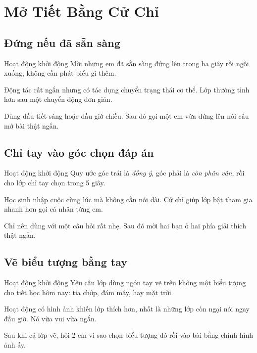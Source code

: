 \chapter{Mở Tiết Bằng Cử Chỉ}

\section{Đứng nếu đã sẵn sàng}
\begin{khoidongbox}{Hoạt động khởi động}
Mời những em đã sẵn sàng đứng lên trong ba giây rồi ngồi xuống, không cần phát biểu gì thêm.
\end{khoidongbox}
\begin{visaohieuqua}
Động tác rất ngắn nhưng có tác dụng chuyển trạng thái cơ thể. Lớp thường tỉnh hơn sau một chuyển động đơn giản.
\end{visaohieuqua}
\begin{cachlam5phut}
Dùng đầu tiết sáng hoặc đầu giờ chiều. Sau đó gọi một em vừa đứng lên nói câu mở bài thật ngắn.
\end{cachlam5phut}
\ngancach

\section{Chỉ tay vào góc chọn đáp án}
\begin{khoidongbox}{Hoạt động khởi động}
Quy ước góc trái là \textit{đồng ý}, góc phải là \textit{còn phân vân}, rồi cho lớp chỉ tay chọn trong 5 giây.
\end{khoidongbox}
\begin{visaohieuqua}
Học sinh nhập cuộc cùng lúc mà không cần nói dài. Cử chỉ giúp lớp bật tham gia nhanh hơn gọi cá nhân từng em.
\end{visaohieuqua}
\begin{cachlam5phut}
Chỉ nên dùng với một câu hỏi rất nhẹ. Sau đó mời hai bạn ở hai phía giải thích thật ngắn.
\end{cachlam5phut}
\ngancach

\section{Vẽ biểu tượng bằng tay}
\begin{khoidongbox}{Hoạt động khởi động}
Yêu cầu lớp dùng ngón tay vẽ trên không một biểu tượng cho tiết học hôm nay: tia chớp, đám mây, hay mặt trời.
\end{khoidongbox}
\begin{visaohieuqua}
Hoạt động có hình ảnh khiến lớp thích hơn, nhất là những lớp còn ngại nói ngay đầu giờ. Nó vừa vui vừa ngắn.
\end{visaohieuqua}
\begin{cachlam5phut}
Sau khi cả lớp vẽ, hỏi 2 em vì sao chọn biểu tượng đó rồi vào bài bằng chính hình ảnh ấy.
\end{cachlam5phut}
\ngancach

